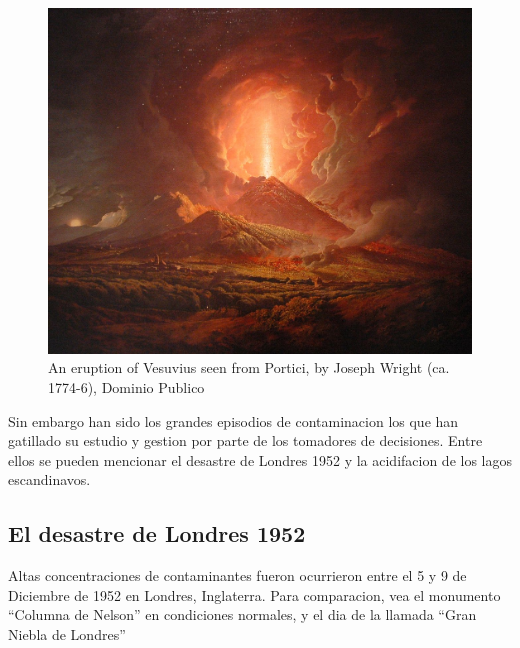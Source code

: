 \documentclass[]{book}
\begin{document}
\begin{figure}
\centering
\includegraphics{figs/1280px-Joseph_Wright_of_Derby_-_Vesuvius_from_Portici.jpg}
\caption{\label{fig:unnamed-chunk-4}An eruption of Vesuvius seen from Portici, by Joseph Wright (ca. 1774-6), Dominio Publico}
\end{figure}

Sin embargo han sido los grandes episodios de contaminacion los que han gatillado su estudio y gestion por parte de los tomadores de decisiones. Entre ellos se pueden mencionar el desastre de Londres 1952 y la acidifacion de los lagos escandinavos.

\hypertarget{el-desastre-de-londres-1952}{%
\subsection{El desastre de Londres 1952}\label{el-desastre-de-londres-1952}}

Altas concentraciones de contaminantes fueron ocurrieron entre el 5 y 9 de Diciembre de 1952 en Londres, Inglaterra. Para comparacion, vea el monumento ``Columna de Nelson'' en condiciones normales\citep{nelson1}, y el dia de la llamada ``Gran Niebla de Londres''\citep{nelson2}
\end{document}
